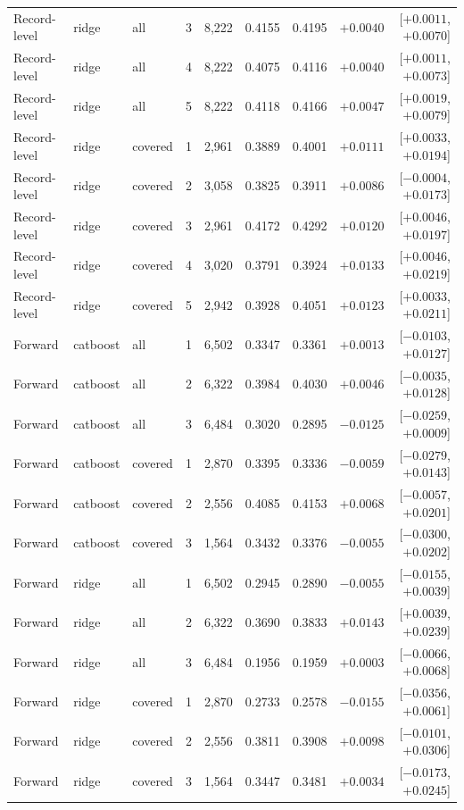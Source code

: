 \documentclass[10pt]{article}
\begin{document}
{\begin{longtable}{llllrrrrr}
Record-level & ridge & all & 3 & 8,222 & 0.4155 & 0.4195 & $+0.0040$ & [$+0.0011$, $+0.0070$]\\
Record-level & ridge & all & 4 & 8,222 & 0.4075 & 0.4116 & $+0.0040$ & [$+0.0011$, $+0.0073$]\\
Record-level & ridge & all & 5 & 8,222 & 0.4118 & 0.4166 & $+0.0047$ & [$+0.0019$, $+0.0079$]\\
Record-level & ridge & covered & 1 & 2,961 & 0.3889 & 0.4001 & $+0.0111$ & [$+0.0033$, $+0.0194$]\\
Record-level & ridge & covered & 2 & 3,058 & 0.3825 & 0.3911 & $+0.0086$ & [$-0.0004$, $+0.0173$]\\
Record-level & ridge & covered & 3 & 2,961 & 0.4172 & 0.4292 & $+0.0120$ & [$+0.0046$, $+0.0197$]\\
Record-level & ridge & covered & 4 & 3,020 & 0.3791 & 0.3924 & $+0.0133$ & [$+0.0046$, $+0.0219$]\\
Record-level & ridge & covered & 5 & 2,942 & 0.3928 & 0.4051 & $+0.0123$ & [$+0.0033$, $+0.0211$]\\
Forward & catboost & all & 1 & 6,502 & 0.3347 & 0.3361 & $+0.0013$ & [$-0.0103$, $+0.0127$]\\
Forward & catboost & all & 2 & 6,322 & 0.3984 & 0.4030 & $+0.0046$ & [$-0.0035$, $+0.0128$]\\
Forward & catboost & all & 3 & 6,484 & 0.3020 & 0.2895 & $-0.0125$ & [$-0.0259$, $+0.0009$]\\
Forward & catboost & covered & 1 & 2,870 & 0.3395 & 0.3336 & $-0.0059$ & [$-0.0279$, $+0.0143$]\\
Forward & catboost & covered & 2 & 2,556 & 0.4085 & 0.4153 & $+0.0068$ & [$-0.0057$, $+0.0201$]\\
Forward & catboost & covered & 3 & 1,564 & 0.3432 & 0.3376 & $-0.0055$ & [$-0.0300$, $+0.0202$]\\
Forward & ridge & all & 1 & 6,502 & 0.2945 & 0.2890 & $-0.0055$ & [$-0.0155$, $+0.0039$]\\
Forward & ridge & all & 2 & 6,322 & 0.3690 & 0.3833 & $+0.0143$ & [$+0.0039$, $+0.0239$]\\
Forward & ridge & all & 3 & 6,484 & 0.1956 & 0.1959 & $+0.0003$ & [$-0.0066$, $+0.0068$]\\
Forward & ridge & covered & 1 & 2,870 & 0.2733 & 0.2578 & $-0.0155$ & [$-0.0356$, $+0.0061$]\\
Forward & ridge & covered & 2 & 2,556 & 0.3811 & 0.3908 & $+0.0098$ & [$-0.0101$, $+0.0306$]\\
Forward & ridge & covered & 3 & 1,564 & 0.3447 & 0.3481 & $+0.0034$ & [$-0.0173$, $+0.0245$]\\
\bottomrule\end{longtable}}
\end{document}
